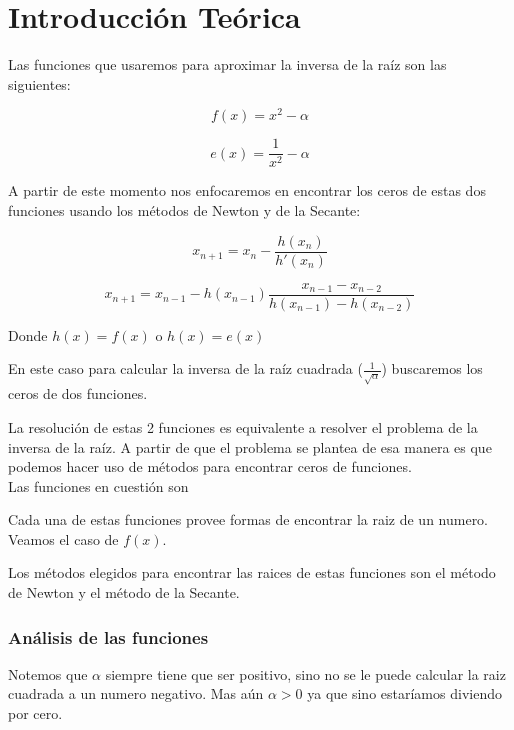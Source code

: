 \section{Introducción Teórica}

Las funciones que usaremos para aproximar la inversa de la raíz son las siguientes:

\begin{displaymath}
    f(x) = x^2 - \alpha
\end{displaymath}

\begin{displaymath}
    e(x) = \frac{1}{x^2} - \alpha
\end{displaymath}

A partir de este momento nos enfocaremos en encontrar los ceros de estas dos funciones usando los métodos de Newton y de la Secante:

\begin{displaymath}
    x_{n + 1} = x_n - \frac{h(x_n)}{h'(x_n)}
\end{displaymath}

\begin{displaymath}
    x_{n + 1} = x_{n - 1} - h(x_{n - 1})\frac{x_{n - 1} - x_{n - 2}}{h(x_{n - 1}) - h(x_{n - 2})}
\end{displaymath}

Donde $\displaystyle h(x) = f(x)$ o $\displaystyle h(x) = e(x)$

En este caso para calcular la inversa de la raíz cuadrada
($\displaystyle\frac{1}{\sqrt{\alpha}}$) buscaremos los ceros de dos funciones.

La resolución de estas 2 funciones es equivalente a resolver el problema de la
inversa de la raíz. A partir de que el problema se plantea de esa manera es que
podemos hacer uso de métodos para encontrar ceros de funciones.\\

Las funciones en cuestión son


Cada una de estas funciones provee formas de encontrar la raiz de un numero.
Veamos el caso de $f(x)$.

Los métodos elegidos para encontrar las raices de estas funciones son el método
de Newton y el método de la Secante.

\subsubsection{Análisis de las funciones}

Notemos que $\alpha$ siempre tiene que ser positivo, sino no se le puede calcular la raiz cuadrada a un numero negativo. Mas aún $\alpha > 0$ ya que sino estaríamos diviendo por cero.

